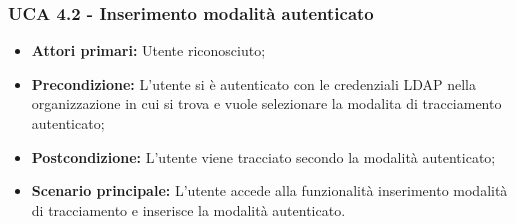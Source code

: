 \subsubsection{UCA 4.2 - Inserimento modalità autenticato}%
\begin{itemize}
	\item \textbf{Attori primari:} Utente riconosciuto;
	\item \textbf{Precondizione:} L'utente si è autenticato con le credenziali LDAP nella organizzazione in cui si trova e vuole selezionare la modalita di tracciamento autenticato;
	\item \textbf{Postcondizione:}  L'utente viene tracciato secondo la modalità autenticato;
	\item \textbf{Scenario principale:} L'utente accede alla funzionalità inserimento modalità di tracciamento e inserisce la modalità autenticato.
\end{itemize}
